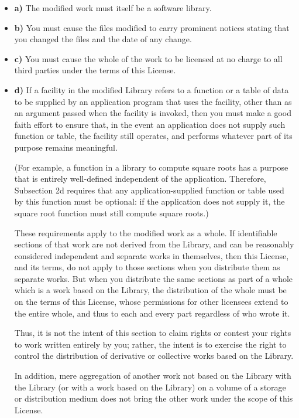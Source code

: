 \begin{itemize}
\item {\bf a)}  The modified work must itself be a software library.  
\item {\bf b)}  You must cause the files modified to carry prominent notices 
   stating that you changed the files and the date of any change.  
\item {\bf c)}  You must cause the whole of the work to be licensed at no 
   charge to all third parties under the terms of this License.  
\item {\bf d)}  If a facility in the modified Library refers to a function or
   a  table of data to be supplied by an application program that uses  the
   facility, other than as an argument passed when the facility  is invoked, then
you must make a good faith effort to ensure that,  in the event an application
does not supply such function or  table, the facility still operates, and
performs whatever part of  its purpose remains meaningful.  

(For example, a function in a library to compute square roots has  a purpose
that is entirely well-defined independent of the  application. Therefore,
Subsection 2d requires that any  application-supplied function or table used
by this function must  be optional: if the application does not supply it, the
square  root function must still compute square roots.)  

These requirements apply to the modified work as a whole. If  identifiable
sections of that work are not derived from the Library,  and can be reasonably
considered independent and separate works in  themselves, then this License,
and its terms, do not apply to those  sections when you distribute them as
separate works. But when you  distribute the same sections as part of a whole
which is a work based  on the Library, the distribution of the whole must be
on the terms of  this License, whose permissions for other licensees extend to
the  entire whole, and thus to each and every part regardless of who wrote 
it.  

Thus, it is not the intent of this section to claim rights or contest  your
rights to work written entirely by you; rather, the intent is to  exercise the
right to control the distribution of derivative or  collective works based on
the Library.  

In addition, mere aggregation of another work not based on the Library  with
the Library (or with a work based on the Library) on a volume of  a storage or
distribution medium does not bring the other work under  the scope of this
License. 
\end{itemize}

